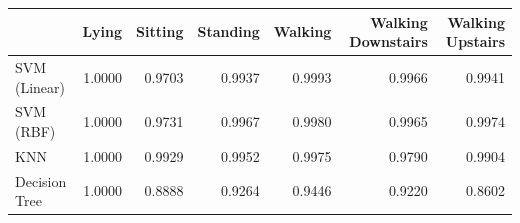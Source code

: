 \begin{tabular}{lrrrrrr}
\toprule
 & Lying & Sitting & Standing & Walking & Walking Downstairs & Walking Upstairs \\
\midrule
SVM (Linear) & 1.0000 & 0.9703 & 0.9937 & 0.9993 & 0.9966 & 0.9941 \\
SVM (RBF) & 1.0000 & 0.9731 & 0.9967 & 0.9980 & 0.9965 & 0.9974 \\
KNN & 1.0000 & 0.9929 & 0.9952 & 0.9975 & 0.9790 & 0.9904 \\
Decision Tree & 1.0000 & 0.8888 & 0.9264 & 0.9446 & 0.9220 & 0.8602 \\
\bottomrule
\end{tabular}
